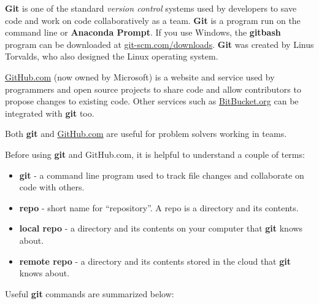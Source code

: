 \documentclass{book}
\providecommand{\tightlist}{%
      \setlength{\itemsep}{0pt}\setlength{\parskip}{0pt}}
\begin{document}
    
        \textbf{Git} is one of the standard \emph{version control} systems used
by developers to save code and work on code collaboratively as a team.
\textbf{Git} is a program run on the command line or \textbf{Anaconda
Prompt}. If you use Windows, the \textbf{gitbash} program can be
downloaded at
\href{https://git-scm.com/downloads}{git-scm.com/downloads}.
\textbf{Git} was created by Linus Torvalds, who also designed the Linux
operating system.
    




    
        \href{https://github.com/}{GitHub.com} (now owned by Microsoft) is a
website and service used by programmers and open source projects to
share code and allow contributors to propose changes to existing code.
Other services such as \href{https://bitbucket.org}{BitBucket.org} can
be integrated with \textbf{git} too.
    




    
        Both \textbf{git} and \href{https://github.com/}{GitHub.com} are useful
for problem solvers working in teams.
    




    
        Before using \textbf{git} and GitHub.com, it is helpful to understand a
couple of terms:

\begin{itemize}
\tightlist
\item
  \textbf{git} - a command line program used to track file changes and
  collaborate on code with others.
\item
  \textbf{repo} - short name for ``repository''. A repo is a directory
  and its contents.
\item
  \textbf{local repo} - a directory and its contents on your computer
  that \textbf{git} knows about.
\item
  \textbf{remote repo} - a directory and its contents stored in the
  cloud that \textbf{git} knows about.
\end{itemize}
    




    
        Useful \textbf{git} commands are summarized below:
\end{document}
